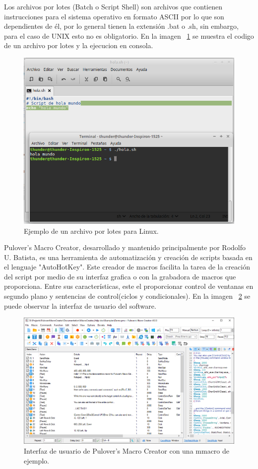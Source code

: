 Los archivos por lotes (Batch o Script Shell) \cite{Silberschatz1999} son
 archivos que contienen instrucciones para el sistema operativo en formato
 ASCII por lo que son dependientes de él, por lo general tienen la extensión
 .bat o .sh, sin embargo, para el caso de UNIX esto no es obligatorio. En la
 imagen ~\ref{fig:script} se muestra el codigo de un archivo por lotes y la 
 ejecucion en consola.


\begin{figure}[H]
\centering
\includegraphics[width=0.5\columnwidth]{CapituloI/Imagenes/Script.png}
\caption{Ejemplo de un archivo por lotes para Linux.}
\label{fig:script}
\end{figure}


Pulover's Macro Creator\cite{Batista}, desarrollado y mantenido principalmente
 por Rodolfo U. Batista, es una herramienta de automatización y creación de
 scripts basada en el lenguaje "AutoHotKey". Este  creador de macros facilita
 la tarea de la creación del script por medio de  su interfaz grafica o con la
 grabadora de macros que proporciona. Entre sus características, este el
 proporcionar  control de ventanas en segundo plano y sentencias de
 control(ciclos y condicionales). En la imagen ~\ref{fig:macros} se puede observar la interfaz de usuario del software.


\begin{figure}[H]
\centering
\includegraphics[width=0.5\columnwidth]{CapituloI/Imagenes/Macros.png}
\caption{Interfaz de usuario de Pulover's Macro Creator con una mmacro de
 ejemplo.}
\label{fig:macros}
\end{figure}



